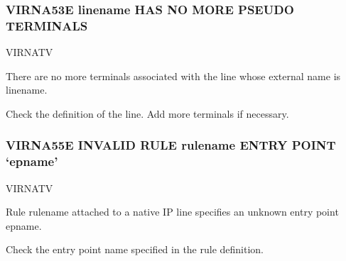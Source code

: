 \documentclass[letterpaper,10pt,english]{sphinxmanual}
\begin{document}
\subsubsection{VIRNA53E linename HAS NO MORE PSEUDO TERMINALS}
\label{\detokenize{messages:virna53e-linename-has-no-more-pseudo-terminals}}\begin{description}
\sphinxAtStartPar
VIRNATV

\sphinxAtStartPar
There are no more terminals associated with the line whose external name is linename.

\sphinxAtStartPar
Check the definition of the line. Add more terminals if necessary.

\end{description}


\subsubsection{VIRNA55E INVALID RULE rulename ENTRY POINT ‘epname’}
\label{\detokenize{messages:virna55e-invalid-rule-rulename-entry-point-epname}}\begin{description}
\sphinxAtStartPar
VIRNATV

\sphinxAtStartPar
Rule rulename attached to a native IP line specifies an unknown entry point epname.

\sphinxAtStartPar
Check the entry point name specified in the rule definition.

\end{description}
\end{document}
